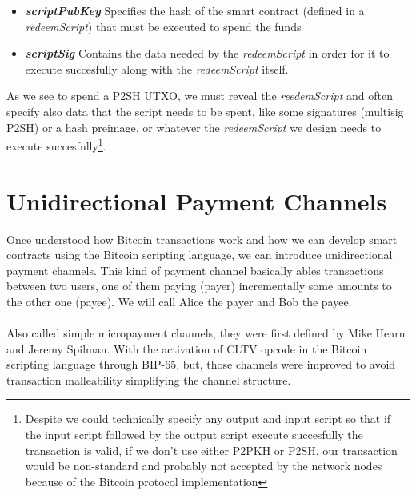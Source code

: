 \documentclass[12pt,journal,compsoc]{IEEEtran}
\begin{document}
\begin{itemize}
    \item \textbf{\textit{scriptPubKey}} Specifies the hash of the smart contract (defined in a \textit{redeemScript}) that must be executed to spend the funds
    \item \textbf{\textit{scriptSig}} Contains the data needed by the \textit{redeemScript} in order for it to execute succesfully along with the \textit{redeemScript} itself.
\end{itemize}
As we see to spend a P2SH UTXO, we must reveal the \textit{reedemScript} and often specify also data that the script needs to be spent, like some signatures (multisig P2SH) or a hash preimage, or whatever the \textit{redeemScript} we design needs to execute succesfully\footnote{Despite we could technically specify any output and input script so that if the input script followed by the output script execute succesfully the transaction is valid, if we don't use either P2PKH or P2SH, our transaction would be non-standard and probably not accepted by the network nodes because of the Bitcoin protocol implementation\cite{bitcoin-se-non-standard:online}}.
\section{Unidirectional Payment Channels}
Once understood how Bitcoin transactions work and how we can develop smart contracts using the Bitcoin scripting language, we can introduce unidirectional payment channels. This kind of payment channel basically ables transactions between two users, one of them paying (payer) incrementally some amounts to the other one (payee). We will call Alice the payer and Bob the payee. \\\\Also called simple micropayment channels, they were first defined by Mike Hearn and Jeremy Spilman\cite{bitcoin-wiki-contract:online}. With the activation of CLTV opcode in the Bitcoin scripting language through BIP-65\cite{bip-65:online}, but, those channels were improved to avoid transaction malleability\cite{bitcoin-wiki-tx-malleability:online} simplifying the channel structure.
\end{document}
